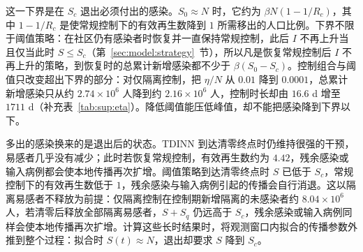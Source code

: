 这一下界是在 $S_c$ 退出必须付出的感染。$S_0\approx N$ 时，它约为 $\beta N(1-1/R_c)$，其中 $1-1/R_c$ 是使常规控制下的有效再生数降到 $1$ 所需移出的人口比例。下界不限于阈值策略：在社区仍有感染者时恢复并一直保持常规控制，此后 $I$ 不再上升当且仅当此时 $S\le S_c$（第~\ref{sec:model:strategy}~节），所以凡是恢复常规控制后 $I$ 不再上升的策略，到恢复时的总累计新增感染都不少于 $\beta(S_0-S_c)$。控制组合与阈值只改变超出下界的部分：对仅隔离控制，把 $\eta/N$ 从 $0.01$ 降到 $0.0001$，总累计新增感染只从约 $2.74\times10^6$ 人降到约 $2.16\times10^6$ 人，控制时长却由 $16.6$ d 增至 $1711$ d（补充表~\ref*{tab:sup:eta}）。降低阈值能压低峰值，却不能把感染降到下界以下。

多出的感染换来的是退出后的状态。TDINN 到达清零终点时仍维持很强的干预，易感者几乎没有减少；此时若恢复常规控制，有效再生数约为 $4.42$，残余感染或输入病例都会使本地传播再次扩增。阈值策略到达清零终点时 $S$ 已低于 $S_c$，常规控制下的有效再生数低于 $1$，残余感染与输入病例引起的传播会自行消退。这以隔离易感者不释放为前提：仅隔离控制在控制期新增隔离的未感染者约 $8.04\times10^6$ 人，若清零后释放全部隔离易感者，$S+S_q$ 仍远高于 $S_c$，残余感染或输入病例同样会使本地传播再次扩增。计算这些长时结果时，将观测窗口内拟合的传播参数外推到整个过程：拟合时 $S(t)\approx N$，退出却要求 $S$ 降到 $S_c$。

\FloatBarrier
\endgroup
